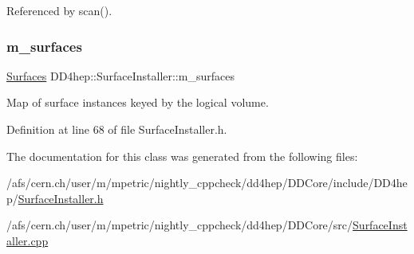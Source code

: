 Referenced by scan().

\hypertarget{class_d_d4hep_1_1_surface_installer_aa301ec142bb36afc171389e0e8acabd2}{}\label{class_d_d4hep_1_1_surface_installer_aa301ec142bb36afc171389e0e8acabd2} 
\subsubsection{\texorpdfstring{m\+\_\+surfaces}{m\_surfaces}}
{\footnotesize\ttfamily \hyperlink{class_d_d4hep_1_1_surface_installer_a16346209b86955ff4a4a380c3ce1bcd2}{Surfaces} D\+D4hep\+::\+Surface\+Installer\+::m\+\_\+surfaces\hspace{0.3cm}{\ttfamily [protected]}}



Map of surface instances keyed by the logical volume. 



Definition at line 68 of file Surface\+Installer.\+h.



The documentation for this class was generated from the following files\+:\begin{DoxyCompactItemize}
\item 
/afs/cern.\+ch/user/m/mpetric/nightly\+\_\+cppcheck/dd4hep/\+D\+D\+Core/include/\+D\+D4hep/\hyperlink{_surface_installer_8h}{Surface\+Installer.\+h}\item 
/afs/cern.\+ch/user/m/mpetric/nightly\+\_\+cppcheck/dd4hep/\+D\+D\+Core/src/\hyperlink{_surface_installer_8cpp}{Surface\+Installer.\+cpp}\end{DoxyCompactItemize}
